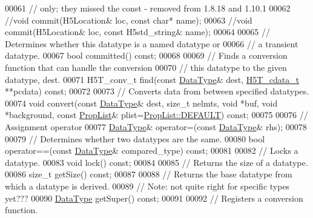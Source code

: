 \begin{DoxyCode}
00061         \textcolor{comment}{// only; they missed the const - removed from 1.8.18 and 1.10.1}
00062         \textcolor{comment}{//void commit(H5Location& loc, const char* name);}
00063         \textcolor{comment}{//void commit(H5Location& loc, const H5std\_string& name);}
00064 
00065         \textcolor{comment}{// Determines whether this datatype is a named datatype or}
00066         \textcolor{comment}{// a transient datatype.}
00067         \textcolor{keywordtype}{bool} committed() \textcolor{keyword}{const};
00068 
00069         \textcolor{comment}{// Finds a conversion function that can handle the conversion}
00070         \textcolor{comment}{// this datatype to the given datatype, dest.}
00071         H5T\_conv\_t find(\textcolor{keyword}{const} \hyperlink{class_h5_1_1_data_type}{DataType}& dest, \hyperlink{struct_h5_t__cdata__t}{H5T\_cdata\_t} **pcdata) \textcolor{keyword}{const};
00072 
00073         \textcolor{comment}{// Converts data from between specified datatypes.}
00074         \textcolor{keywordtype}{void} convert(\textcolor{keyword}{const} \hyperlink{class_h5_1_1_data_type}{DataType}& dest, \textcolor{keywordtype}{size\_t} nelmts, \textcolor{keywordtype}{void} *buf, \textcolor{keywordtype}{void} *background, \textcolor{keyword}{const} 
      \hyperlink{class_h5_1_1_prop_list}{PropList}& plist=\hyperlink{class_h5_1_1_prop_list_ae52af66ce82af0ea7e6dc57148c56241}{PropList::DEFAULT}) \textcolor{keyword}{const};
00075 
00076         \textcolor{comment}{// Assignment operator}
00077         \hyperlink{class_h5_1_1_data_type}{DataType}& operator=(\textcolor{keyword}{const} \hyperlink{class_h5_1_1_data_type}{DataType}& rhs);
00078 
00079         \textcolor{comment}{// Determines whether two datatypes are the same.}
00080         \textcolor{keywordtype}{bool} operator==(\textcolor{keyword}{const} \hyperlink{class_h5_1_1_data_type}{DataType}& compared\_type) \textcolor{keyword}{const};
00081 
00082         \textcolor{comment}{// Locks a datatype.}
00083         \textcolor{keywordtype}{void} lock() \textcolor{keyword}{const};
00084 
00085         \textcolor{comment}{// Returns the size of a datatype.}
00086         \textcolor{keywordtype}{size\_t} getSize() \textcolor{keyword}{const};
00087 
00088         \textcolor{comment}{// Returns the base datatype from which a datatype is derived.}
00089         \textcolor{comment}{// Note: not quite right for specific types yet???}
00090         \hyperlink{class_h5_1_1_data_type}{DataType} getSuper() \textcolor{keyword}{const};
00091 
00092         \textcolor{comment}{// Registers a conversion function.}

\end{DoxyCode}
